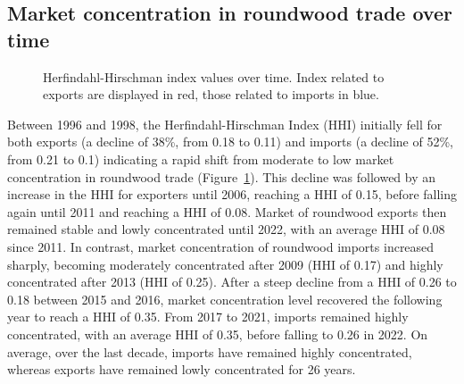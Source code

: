 \documentclass[
  authoryear,
  review,
  3p]{elsarticle}
\begin{document}
\subsection{Market concentration in roundwood trade over
time}\label{market-concentration-in-roundwood-trade-over-time}

\begin{figure}[t]


\caption{\label{fig-market-concentration}Herfindahl-Hirschman index
values over time. Index related to exports are displayed in red, those
related to imports in blue.}

\end{figure}%

Between 1996 and 1998, the Herfindahl-Hirschman Index (HHI) initially
fell for both exports (a decline of 38\%, from 0.18 to 0.11) and imports
(a decline of 52\%, from 0.21 to 0.1) indicating a rapid shift from
moderate to low market concentration in roundwood trade
(Figure~\ref{fig-market-concentration}). This decline was followed by an
increase in the HHI for exporters until 2006, reaching a HHI of 0.15,
before falling again until 2011 and reaching a HHI of 0.08. Market of
roundwood exports then remained stable and lowly concentrated until
2022, with an average HHI of 0.08 since 2011. In contrast, market
concentration of roundwood imports increased sharply, becoming
moderately concentrated after 2009 (HHI of 0.17) and highly concentrated
after 2013 (HHI of 0.25). After a steep decline from a HHI of 0.26 to
0.18 between 2015 and 2016, market concentration level recovered the
following year to reach a HHI of 0.35. From 2017 to 2021, imports
remained highly concentrated, with an average HHI of 0.35, before
falling to 0.26 in 2022. On average, over the last decade, imports have
remained highly concentrated, whereas exports have remained lowly
concentrated for 26 years.
\end{document}
